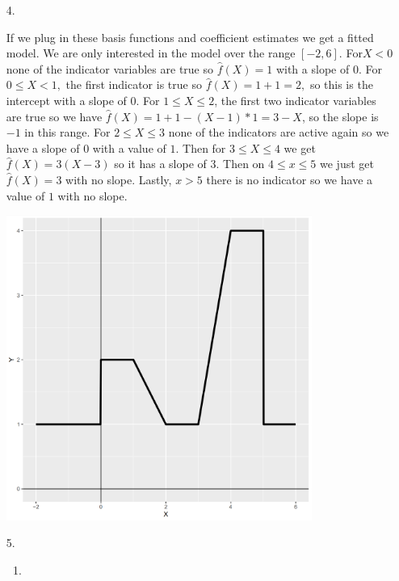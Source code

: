 \documentclass{article}
\begin{document}
\begin{enumerate}
\begin{enumerate}
    \end{enumerate}
    
    \item [4. ]
    
    If we plug in these basis functions and coefficient estimates we get a fitted model. We are only interested in the model over the range $[-2, 6]$. For$X<0$ none of the indicator variables are true so $\hat{f}(X) = 1$ with a slope of $0.$ For $0\leq X < 1,$ the first indicator is true so $\hat{f}(X) = 1 + 1 = 2,$ so this is the intercept with a slope of $0.$ For $1\leq X\leq 2$, the first two indicator variables are true so we have $\hat{f}(X) = 1 + 1 - (X-1) * 1 = 3-X$, so the slope is $-1$ in this range. For $2\leq X\leq3$ none of the indicators are active again so we have a slope of $0$ with a value of $1.$ Then for $3 \leq X\leq 4$ we get $\hat{f}(X) = 3(X-3)$ so it has a slope of $3.$ Then on $4\leq x\leq 5$ we just get $\hat{f}(X) = 3$ with no slope. Lastly, $x > 5$ there is no indicator so we have a value of $1$ with no slope.\\
    \begin{center}
    \includegraphics[width=10cm]{graph_4.png}
    \end{center}
    
    \item [5. ]
    
    \begin{enumerate}
        \item 
        

\end{enumerate}
\end{enumerate}
\end{document}
